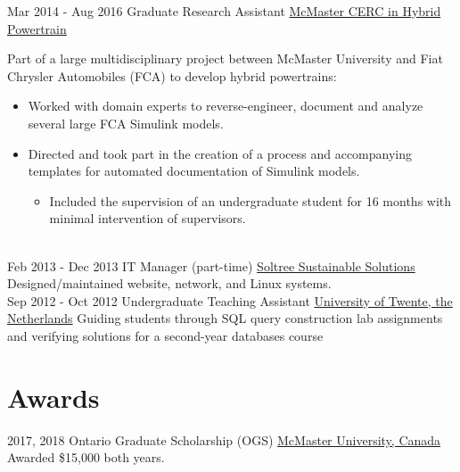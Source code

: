 \documentclass[letterpaper]{twentysecondcv} %
\begin{document}
\begin{twenty}
  \twentyitem
	{Mar 2014 -}
	{Aug 2016}
	{Graduate Research Assistant}
	{\href{http://hybrid.mcmaster.ca/}{McMaster CERC in Hybrid Powertrain}}
	{}
	{Part of a large multidisciplinary project
    between McMaster University and Fiat Chrysler Automobiles (FCA) to develop
    hybrid powertrains:
    \begin{itemize}
			\item Worked with domain experts to reverse-engineer, document and analyze several large FCA Simulink models.
			\item Directed and took part in the creation of a process and accompanying templates for automated documentation of Simulink models.
      \begin{itemize}
        \item Included the supervision of an undergraduate student for 16 months with minimal intervention of supervisors.
      \end{itemize}
  \end{itemize}}
  \\
  \twentyitem
  {Feb 2013 -}
  {Dec 2013}
  {IT Manager (part-time)}
  {\href{http://www.soltree.net/}{Soltree Sustainable Solutions}}
  {}
  {Designed/maintained website, network, and Linux systems.}
  \\
  \twentyitem
  {Sep 2012 -}
  {Oct 2012}
  {Undergraduate Teaching Assistant}
  {\href{https://www.utwente.nl/}{University of Twente, the Netherlands}}
  {}
  {Guiding students through SQL query construction lab assignments and verifying solutions for a second-year databases course}
\end{twenty} 

\vspace{-0.5em}
\section{Awards}
\vspace{-0.5em}
\begin{twenty}
  \twentyitem
  {2017,}
  {2018}
  {Ontario Graduate Scholarship (OGS)}
  {\href{https://www.mcmaster.ca/}{McMaster University, Canada}}
  {}
  {Awarded \$15,000 both years.}
\end{twenty}
\end{document}
